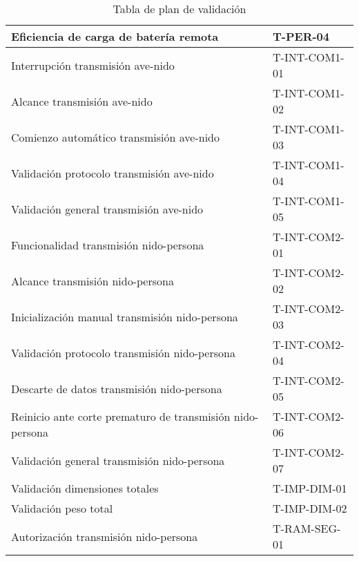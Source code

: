 \begin{table}[H]
\begin{tabular}{|l|l|}
Eficiencia de carga de batería remota                                & T-PER-04                                  \\ \hline
Interrupción transmisión ave-nido                                    & T-INT-COM1-01                             \\ \hline
Alcance transmisión ave-nido                                         & T-INT-COM1-02                             \\ \hline
Comienzo automático transmisión ave-nido                             & T-INT-COM1-03                             \\ \hline
Validación protocolo transmisión ave-nido                            & T-INT-COM1-04                             \\ \hline
Validación general transmisión ave-nido                              & T-INT-COM1-05                             \\ \hline
Funcionalidad transmisión nido-persona                               & T-INT-COM2-01                             \\ \hline
Alcance transmisión nido-persona                                     & T-INT-COM2-02                             \\ \hline
Inicialización manual transmisión nido-persona                       & T-INT-COM2-03                             \\ \hline
Validación protocolo transmisión nido-persona                        & T-INT-COM2-04                             \\ \hline
Descarte de datos transmisión nido-persona                           & T-INT-COM2-05                             \\ \hline
Reinicio ante corte prematuro de transmisión nido-persona            & T-INT-COM2-06                             \\ \hline
Validación general transmisión nido-persona                          & T-INT-COM2-07                             \\ \hline
Validación dimensiones totales                                       & T-IMP-DIM-01                              \\ \hline
Validación peso total                                                & T-IMP-DIM-02                              \\ \hline
Autorización transmisión nido-persona                                & T-RAM-SEG-01                              \\ \hline
\end{tabular}
\caption{Tabla de plan de validación}
\end{table}
